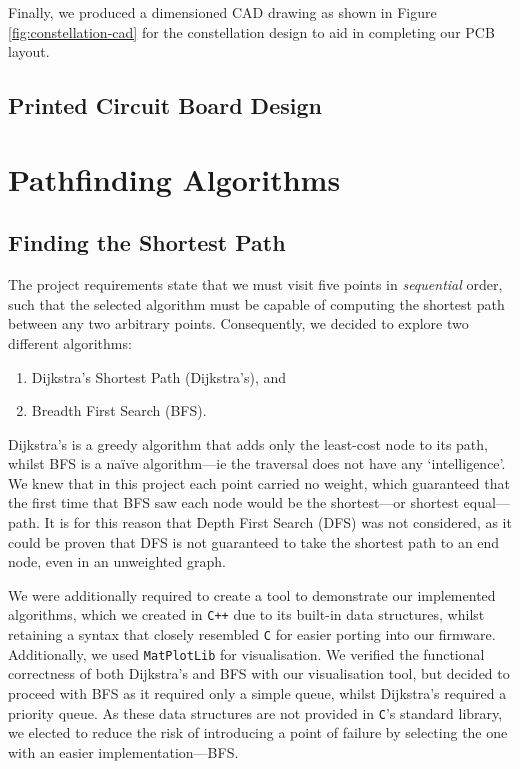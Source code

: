 \documentclass[conference]{IEEEtran}
\begin{document}
Finally, we produced a dimensioned CAD drawing as shown in Figure \ref{fig:constellation-cad} for the constellation design to aid in completing our PCB layout.

\subsection{Printed Circuit Board Design}




\section{Pathfinding Algorithms \label{sect-pathfinding-algorithms}}

\subsection{Finding the Shortest Path}

The project requirements state that we must visit five points in \emph{sequential} order, such that the selected algorithm must be capable of computing the shortest path between any two arbitrary points.
Consequently, we decided to explore two different algorithms:
\begin{enumerate}
	\item Dijkstra's Shortest Path (Dijkstra's), and
	\item Breadth First Search (BFS).
\end{enumerate}
Dijkstra's is a greedy algorithm that adds only the least-cost node to its path, whilst BFS is a naïve algorithm—ie the traversal does not have any `intelligence'.
We knew that in this project each point carried no weight, which guaranteed that the first time that BFS saw each node would be the shortest—or shortest equal—path.
It is for this reason that Depth First Search (DFS) was not considered, as it could be proven that DFS is not guaranteed to take the shortest path to an end node, even in an unweighted graph.

We were additionally required to create a tool to demonstrate our implemented algorithms, which we created in \texttt{C++} due to its built-in data structures, whilst retaining a syntax that closely resembled \texttt{C} for easier porting into our firmware.
Additionally, we used \texttt{MatPlotLib} for visualisation.
We verified the functional correctness of both Dijkstra's and BFS with our visualisation tool, but decided to proceed with BFS as it required only a simple queue, whilst Dijkstra's required a priority queue.
As these data structures are not provided in \texttt{C}'s standard library, we elected to reduce the risk of introducing a point of failure by selecting the one with an easier implementation—BFS.
\end{document}
